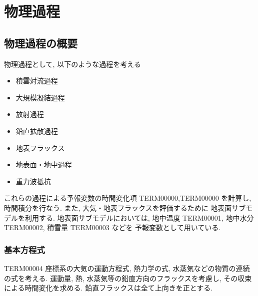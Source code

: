 ﻿
\section{物理過程}

\subsection{物理過程の概要}

物理過程として, 以下のような過程を考える
\begin{itemize}
\item 積雲対流過程
\item 大規模凝結過程
\item 放射過程
\item 鉛直拡散過程
\item 地表フラックス
\item 地表面・地中過程
\item 重力波抵抗
\end{itemize}
これらの過程による予報変数の時間変化項
TERM00000,TERM00000 を計算し, 時間積分を行なう.
また, 大気・地表フラックスを評価するために
地表面サブモデルを利用する.
地表面サブモデルにおいては,
地中温度 TERM00001, 地中水分 TERM00002, 積雪量 TERM00003 などを
予報変数として用いている.


\subsubsection{基本方程式}

TERM00004 座標系の大気の運動方程式, 熱力学の式,
水蒸気などの物質の連続の式を考える.
運動量, 熱, 水蒸気等の鉛直方向のフラックスを考慮し,
その収束による時間変化を求める.
鉛直フラックスは全て上向きを正とする.

